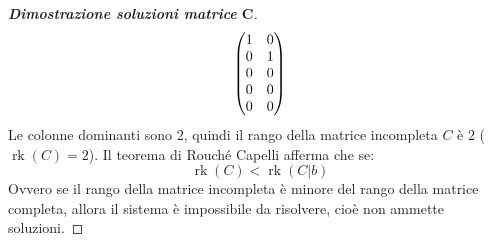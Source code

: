 \documentclass[a4paper]{article}
\makeatletter
\DeclareMathOperator{\rk}{rk}
\newenvironment{rowequmat}[1]{\left(\array{@{}#1@{}}}{\endarray\right)}
\makeatother
\begin{document}
\begin{proof}[\textbf{Dimostrazione soluzioni matrice} $\boldsymbol{C}$]
\begin{gather*}
			\begin{rowequmat}{cc}
				1 & 0 \\
				0 & 1 \\
				0 & 0 \\
				0 & 0 \\
				0 & 0
			\end{rowequmat}
		\end{gather*}
		Le colonne dominanti sono $2$, quindi il rango della matrice incompleta $C$ è $2$ ($\rk\left(C\right) = 2$). Il teorema di Rouché Capelli afferma che se:
		\begin{equation*}
			\rk\left(C\right) < \rk\left(C|b\right)
		\end{equation*}
		Ovvero se il rango della matrice incompleta è minore del rango della matrice completa, allora il sistema è impossibile da risolvere, cioè non ammette soluzioni.
	\end{proof}\newpage
\end{document}
